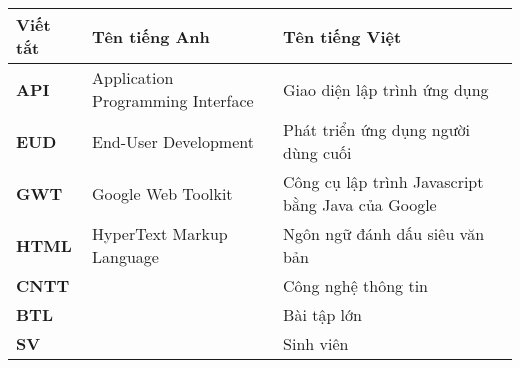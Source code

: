 \documentclass[../BTL.tex]{subfiles}
\begin{document}
\begin{longtable}{l p{6cm} p{7cm}}
	\hline
   \textbf{Viết tắt}  & \textbf{Tên tiếng Anh}	& \textbf{Tên tiếng Việt} \\ \hline 
	\textbf{API} & Application Programming Interface & Giao diện lập trình ứng dụng\\
	\textbf{EUD} & End-User Development & Phát triển ứng dụng người dùng cuối\\
	\textbf{GWT} & Google Web Toolkit & Công cụ lập trình Javascript bằng Java của Google\\
	\textbf{HTML} & HyperText Markup Language & Ngôn ngữ đánh dấu siêu văn bản\\
	\textbf{CNTT }  &   & Công nghệ thông tin\\
	\textbf{BTL} &  & Bài tập lớn \\
	\textbf{SV} &  & Sinh viên \\

    \hline
\end{longtable}
\end{document}
